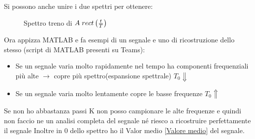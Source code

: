                 Si possono anche unire i due spettri per ottenere: 
                \begin{figure}[H]
                    \centering
                    \caption{Spettro treno di $A\hspace{0.1cm}rect\left(\frac{t}{T}\right)$}
                    \label{fig:Spettro treno di rect}
                \end{figure}  
            Ora appizza MATLAB e fa esempi di un segnale e uno di ricostruzione dello stesso (script di MATLAB presenti su Teams):
            \begin{itemize}
                \item Se un segnale varia molto rapidamente nel tempo ha componenti frequenziali più alte $\rightarrow$ copre più spettro(espansione spettrale) $T_0 \Downarrow$
                \item Se un segnale varia molto lentamente copre le basse frequenze $ T_0 \Uparrow$
            \end{itemize}
            Se non ho abbastanza passi K non posso campionare le alte frequenze e quindi non faccio ne un analisi completa del segnale né riesco a ricostruire perfettamente il segnale  
            Inoltre in $0$ dello spettro ho il Valor medio \ref{Valore medio} del segnale.
